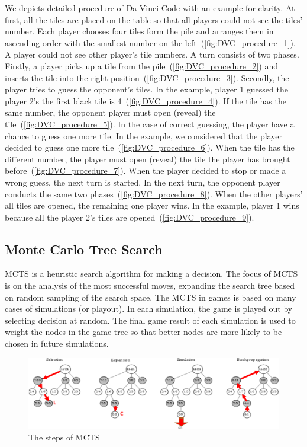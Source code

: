 \documentclass[conference]{IEEEtran}
\begin{document}
We depicts detailed procedure of Da Vinci Code with an example for clarity.
At first, all the tiles are placed on the table so that all players could not see the tiles' number.
Each player chooses four tiles form the pile and arranges them in ascending order with the smallest number on the left~(\cref{fig:DVC_procedure_1}).
A player could not see other player's tile numbers.
A turn consists of two phases.
Firstly, a player picks up a tile from the pile~(\cref{fig:DVC_procedure_2}) and inserts the tile into the right position~(\cref{fig:DVC_procedure_3}).
Secondly, the player tries to guess the opponent's tiles.
In the example, player 1 guessed the player 2's the first black tile is 4~(\cref{fig:DVC_procedure_4}).
If the tile has the same number, the opponent player must open (reveal) the tile~(\cref{fig:DVC_procedure_5}).
In the case of correct guessing, the player have a chance to guess one more tile.
In the example, we considered that the player decided to guess one more tile~(\cref{fig:DVC_procedure_6}).
When the tile has the different number, the player must open (reveal) the tile the player has brought before~(\cref{fig:DVC_procedure_7}).
When the player decided to stop or made a wrong guess, the next turn is started.
In the next turn, the opponent player conducts the same two phases~(\cref{fig:DVC_procedure_8}).
When the other players' all tiles are opened, the remaining one player wins.
In the example, player 1 wins because all the player 2's tiles are opened~(\cref{fig:DVC_procedure_9}).

\subsection{Monte Carlo Tree Search} \label{sec:mcts}

MCTS is a heuristic search algorithm for making a decision.
The focus of MCTS is on the analysis of the most successful moves, expanding the search tree based on random sampling of the search space.
The MCTS in games is based on many cases of simulations (or playout).
In each simulation, the game is played out by selecting decision at random.
The final game result of each simulation is used to weight the nodes in the game tree so that better nodes are more likely to be chosen in future simulations.

\begin{figure}
\includegraphics[width=2.05\columnwidth]{figures/MCTS_step.pdf}
\caption{The steps of MCTS}
\label{fig:MCTS_step}
\end{figure}
\end{document}
